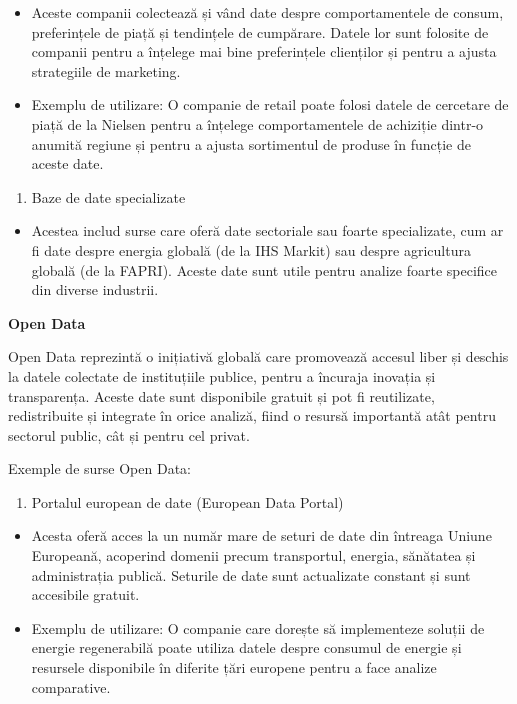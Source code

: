 \documentclass[
  11pt,
  b5paper,
  nottoc]{book}
\providecommand{\tightlist}{%
  \setlength{\itemsep}{0pt}\setlength{\parskip}{0pt}}\usepackage{longtable,booktabs,array}
\begin{document}
\begin{itemize}
\tightlist
\item
  Aceste companii colectează și vând date despre comportamentele de
  consum, preferințele de piață și tendințele de cumpărare. Datele lor
  sunt folosite de companii pentru a înțelege mai bine preferințele
  clienților și pentru a ajusta strategiile de marketing.\\
\item
  Exemplu de utilizare: O companie de retail poate folosi datele de
  cercetare de piață de la Nielsen pentru a înțelege comportamentele de
  achiziție dintr-o anumită regiune și pentru a ajusta sortimentul de
  produse în funcție de aceste date.
\end{itemize}

\begin{enumerate}
\def\labelenumi{\arabic{enumi}.}
\setcounter{enumi}{3}
\tightlist
\item
  Baze de date specializate
\end{enumerate}

\begin{itemize}
\tightlist
\item
  Acestea includ surse care oferă date sectoriale sau foarte
  specializate, cum ar fi date despre energia globală (de la IHS Markit)
  sau despre agricultura globală (de la FAPRI). Aceste date sunt utile
  pentru analize foarte specifice din diverse industrii.
\end{itemize}

\textbf{Open Data}

Open Data reprezintă o inițiativă globală care promovează accesul liber
și deschis la datele colectate de instituțiile publice, pentru a
încuraja inovația și transparența. Aceste date sunt disponibile gratuit
și pot fi reutilizate, redistribuite și integrate în orice analiză,
fiind o resursă importantă atât pentru sectorul public, cât și pentru
cel privat.

Exemple de surse Open Data:

\begin{enumerate}
\def\labelenumi{\arabic{enumi}.}
\tightlist
\item
  Portalul european de date (European Data Portal)
\end{enumerate}

\begin{itemize}
\tightlist
\item
  Acesta oferă acces la un număr mare de seturi de date din întreaga
  Uniune Europeană, acoperind domenii precum transportul, energia,
  sănătatea și administrația publică. Seturile de date sunt actualizate
  constant și sunt accesibile gratuit.\\
\item
  Exemplu de utilizare: O companie care dorește să implementeze soluții
  de energie regenerabilă poate utiliza datele despre consumul de
  energie și resursele disponibile în diferite țări europene pentru a
  face analize comparative.
\end{itemize}
\end{document}
